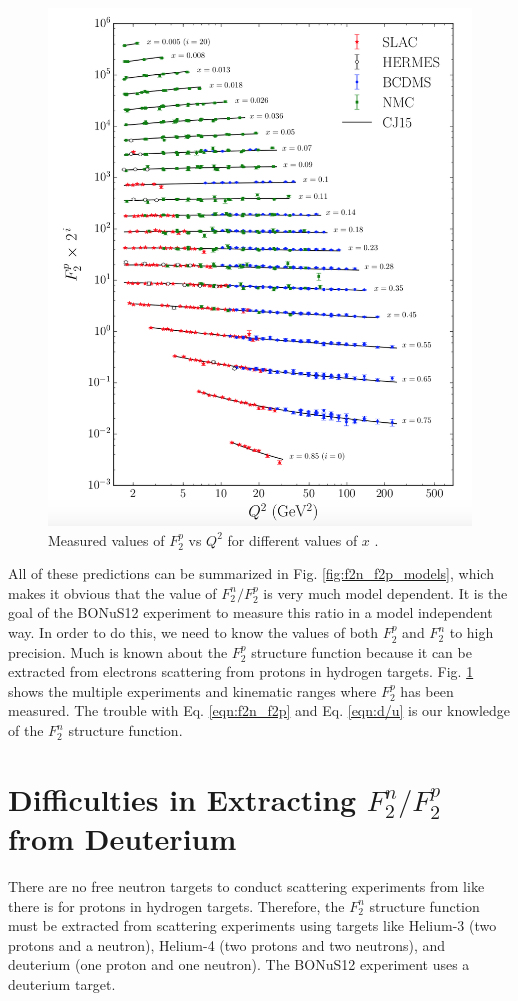  \begin{figure}[h!]
 	\centering
 	\includegraphics[width=0.9\linewidth]{figures/F2p.png}
 	\caption[Measured values of $F_2^p$ vs $Q^2$ for different values of $x$.]{Measured values of $F_2^p$ vs $Q^2$ for different values of $x$ \cite{CJ15}.}
 	\label{fig:f2p}
 \end{figure}
 
All of these predictions can be summarized in Fig. \ref{fig:f2n_f2p_models}, which makes it obvious that the value of $F_2^n/F_2^p$ is very much model dependent. It is the goal of the BONuS12 experiment to measure this ratio in a model independent way. In order to do this, we need to know the values of both $F_2^p$ and $F_2^n$ to high precision. Much is known about the $F_2^p$ structure function because it can be extracted from electrons scattering from protons in hydrogen targets. Fig. \ref{fig:f2p} shows the multiple experiments and kinematic ranges where $F_2^p$ has been measured. The trouble with Eq. \ref{eqn:f2n_f2p} and Eq. \ref{eqn:d/u} is our knowledge of the $F_2^n$ structure function.

\section{Difficulties in Extracting $F_2^n/F_2^p$ from Deuterium}
\label{sec:emc}
There are no free neutron targets to conduct scattering experiments from like there is for protons in hydrogen targets. Therefore, the $F_2^n$ structure function must be extracted from scattering experiments using targets like Helium-3 (two protons and a neutron), Helium-4 (two protons and two neutrons), and deuterium (one proton and one neutron). The BONuS12 experiment uses a deuterium target.

